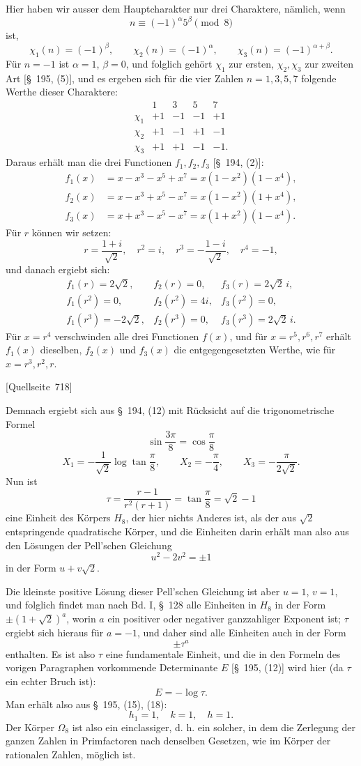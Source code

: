 \documentclass[11pt]{article}
\newcommand{\srcpage}[1]{\par\medskip\noindent\textsf{[Quellseite~#1]}\par\smallskip}
\begin{document}
Hier haben wir ausser dem Hauptcharakter nur drei Charaktere, nämlich, wenn
\[
n\equiv(-1)^\alpha5^\beta\pmod8
\]
ist,
\[
\chi_1(n)=(-1)^\beta,
\qquad
\chi_2(n)=(-1)^\alpha,
\qquad
\chi_3(n)=(-1)^{\alpha+\beta}.
\]
Für $n=-1$ ist $\alpha=1$, $\beta=0$, und folglich gehört $\chi_1$ zur ersten, $\chi_2,\chi_3$ zur zweiten Art [\S~195, (5)], und es ergeben sich für die vier Zahlen $n=1,3,5,7$ folgende Werthe dieser Charaktere:
\[
\begin{array}{c|rrrr}
&1&3&5&7\\\hline
\chi_1&+1&-1&-1&+1\\
\chi_2&+1&-1&+1&-1\\
\chi_3&+1&+1&-1&-1.
\end{array}
\]
Daraus erhält man die drei Functionen $f_1,f_2,f_3$ [\S~194, (2)]:
\[
\begin{aligned}
f_1(x)&=x-x^3-x^5+x^7=x(1-x^2)(1-x^4),\\
f_2(x)&=x-x^3+x^5-x^7=x(1-x^2)(1+x^4),\\
f_3(x)&=x+x^3-x^5-x^7=x(1+x^2)(1-x^4).
\end{aligned}
\]
Für $r$ können wir setzen:
\[
r=\frac{1+i}{\sqrt2},\quad r^2=i,
\quad r^3=-\frac{1-i}{\sqrt2},\quad r^4=-1,
\]
und danach ergiebt sich:
\[
\begin{array}{lll}
f_1(r)=2\sqrt2,& f_2(r)=0,& f_3(r)=2\sqrt2\,i,\\
f_1(r^2)=0,& f_2(r^2)=4i,& f_3(r^2)=0,\\
f_1(r^3)=-2\sqrt2,& f_2(r^3)=0,& f_3(r^3)=2\sqrt2\,i.
\end{array}
\]
Für $x=r^4$ verschwinden alle drei Functionen $f(x)$, und für $x=r^5,r^6,r^7$ erhält $f_1(x)$ dieselben, $f_2(x)$ und $f_3(x)$ die entgegengesetzten Werthe, wie für $x=r^3,r^2,r$.

\srcpage{718}
Demnach ergiebt sich aus \S~194, (12) mit Rücksicht auf die trigonometrische Formel
\[
\sin\frac{3\pi}{8}=\cos\frac\pi8
\]
\[
X_1=-\frac1{\sqrt2}\log\tan\frac\pi8,
\qquad
X_2=-\frac\pi4,
\qquad
X_3=-\frac\pi{2\sqrt2}.
\]
Nun ist
\[
\tau=\frac{r-1}{r^2(r+1)}=\tan\frac\pi8=\sqrt2-1
\]
eine Einheit des Körpers $H_8$, der hier nichts Anderes ist, als der aus $\sqrt2$ entspringende quadratische Körper, und die Einheiten darin erhält man also aus den Lösungen der Pell'schen Gleichung
\[
u^2-2v^2=\pm1
\]
in der Form $u+v\sqrt2$.

Die kleinste positive Lösung dieser Pell'schen Gleichung ist aber $u=1$, $v=1$, und folglich findet man nach Bd. I, \S~128 alle Einheiten in $H_8$ in der Form $\pm(1+\sqrt2)^a$, worin $a$ ein positiver oder negativer ganzzahliger Exponent ist; $\tau$ ergiebt sich hieraus für $a=-1$, und daher sind alle Einheiten auch in der Form
\[
\pm\tau^a
\]
enthalten. Es ist also $\tau$ eine fundamentale Einheit, und die in den Formeln des vorigen Paragraphen vorkommende Determinante $E$ [\S~195, (12)] wird hier (da $\tau$ ein echter Bruch ist):
\[
E=-\log\tau.
\]
Man erhält also aus \S~195, (15), (18):
\[
h_1=1,\quad k=1,\quad h=1.
\]
Der Körper $\Omega_8$ ist also ein einclassiger, d. h. ein solcher, in dem die Zerlegung der ganzen Zahlen in Primfactoren nach denselben Gesetzen, wie im Körper der rationalen Zahlen, möglich ist.
\end{document}
